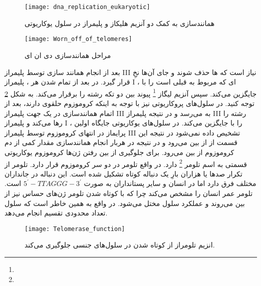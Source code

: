 \begin{figure}[htbp]
	\centering
	\texttt{[image: dna\_replication\_eukaryotic]}
	\caption{همانندسازی 
	به کمک دو آنزیم هلیکاز و  
	پلیمراز
	در سلول یوکاریوتی
	}
	\label{figure:dnaReplication}
\end{figure}

\pagebreak
\begin{wrapfigure}{l}{8cm}
	\centering
	\texttt{[image: Worn\_off\_of\_telomeres]}
\end{wrapfigure}

\begin{figure}[htbp]
	\centering
	\hspace{20pt}	
	\caption{مراحل همانندسازی دی ان ای}
	\label{figure:replication_sections}
\end{figure}

بعد از انجام همانند سازی توسط
 پلیمراز
 \RN{3}
 نیاز است که
 ها حذف شوند و جای آن‌ها نخِ
 قرار گیرد.  در
 بعد از تمام شدن هر
،
پلیمراز
\RN{1}
،
ای که مربوط به
قبلی است را با
جایگزین می‌کند. سپس آنزیم
لیگاز
\footnote{}
پیوند بین دو تکه رشته
را برقرار می‌کند.
به شکل
\ref{figure:replication_sections}
توجه کنید.
در سلول‌های پروکاریوتی نیز با توجه به اینکه کروموزوم حلقوی دارند، بعد از اتمام همانندسازی در یک جهت
پلیمراز
\RN{3}
به
می‌رسد و در نتیجه
پلیمراز
\RN{3}
رشته را رها می‌کند و
پلیمراز
\RN{1}
،
را با
جایگزین می‌کند.
در سلول‌های یوکاریوتی جایگاه اولین پرایماز در انتهای کروموزوم توسط
پلیمراز
\RN{3}
تشخیص داده نمی‌شود در نتیجه این قسمت از
از بین می‌رود و در نتیجه در هربار انجام همانندسازی مقدار کمی از دم کروموزوم از بین می‌رود.
برای جلوگیری از بین رفتن ژن‌ها کروموزوم یوکاریوتی قسمتی به اسم
تلومر
\footnote{}
دارد. در واقع تلومر در دو سر کروموزوم قرار دارد. تلومر از تکرار صدها یا هزاران بارِ یک دنباله کوتاه
تشکیل شده است. این دنباله در جانداران مختلف فرق دارد اما در انسان و سایر پستانداران به صورت
$ 5^\prime-TTAGGG-3^\prime $
است.
تلومر عمر انسان را مشخص می‌کند چرا که با کوتاه شدن تلومر ژن‌های حساس نیز از بین می‌روند و عملکرد سلول مختل می‌شود. در واقع به همین خاطر است که سلول تعداد محدودی تقسیم انجام می‌دهد.

\begin{wrapfigure}[14]{l}{9cm}
	\centering
	\texttt{[image: Telomerase\_function]}
	\caption{ انزیم تلومراز از کوتاه شدن 
	در سلول‌های جنسی جلوگیری می‌کند.}
	\label{figure:TelomeraseFunction}
\end{wrapfigure}

